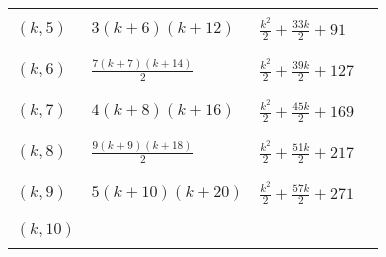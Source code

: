 \documentclass[11pt]{article}
\begin{document}
\begin{table}[]
\begin{tabular}{|l|l|l|l|}
				 &                &                      &                \\ \hline
				 &                &                      &                \\	     
		$(k,5)$  & $\displaystyle 3 \left(k + 6\right) \left(k + 12\right)$               & $\displaystyle \frac{k^{2}}{2} + \frac{33 k}{2} + 91$                     &                \\
				 &                &                      &                \\ \hline
				 &                &                      &                \\	     
		$(k,6)$  & $\displaystyle \frac{7 \left(k + 7\right) \left(k + 14\right)}{2}$               & $\displaystyle \frac{k^{2}}{2} + \frac{39 k}{2} + 127$                     &                \\
				 &                &                      &                \\ \hline
				 &                &                      &                \\	     
		$(k,7)$  & $\displaystyle 4 \left(k + 8\right) \left(k + 16\right)$               & $\displaystyle \frac{k^{2}}{2} + \frac{45 k}{2} + 169$                     &                \\
				 &                &                      &                \\ \hline
				 &                &                      &                \\	     
		$(k,8)$  & $\displaystyle \frac{9 \left(k + 9\right) \left(k + 18\right)}{2}$               & $\displaystyle \frac{k^{2}}{2} + \frac{51 k}{2} + 217$                     &                \\
				 &                &                      &                \\ \hline
				 &                &                      &                \\	     
		$(k,9)$  & $\displaystyle 5 \left(k + 10\right) \left(k + 20\right)$               & $\displaystyle \frac{k^{2}}{2} + \frac{57 k}{2} + 271$                     &                \\
				 &                &                      &                \\ \hline
				 &                &                      &                \\	     
		$(k,10)$ &                &                      &                \\
				 &                &                      &                \\ \hline
	\end{tabular}
\end{table}
\end{document}
